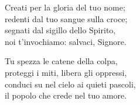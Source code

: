 
 

\spazio

\strofa Creati per la gloria del tuo nome;\\
redenti dal tuo sangue sulla croce;\\
segnati dal sigillo dello Spirito,\\
noi t'invochiamo: salvaci, Signore. 

\spazio


\spazio

\strofa Tu spezza le catene della colpa,\\
proteggi i miti, libera gli oppressi,\\
conduci su nel cielo ai quieti pascoli,\\
il popolo che crede nel tuo amore. 

\spazio

